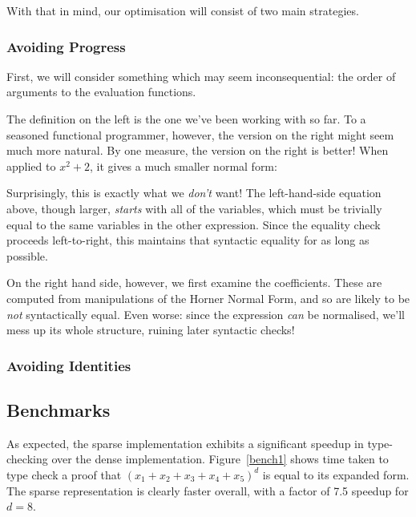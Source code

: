 \documentclass[acmsmall,review,anonymous]{acmart}\settopmatter{printfolios=true,printccs=false,printacmref=false}
\begin{document}
With that in mind, our optimisation will consist of two main strategies.
\subsubsection{Avoiding Progress}
First, we will consider something which may seem inconsequential: the order of
arguments to the evaluation functions.
\begin{multicols}{2}
  \centering
\end{multicols}
The definition on the left is the one we've been working with so far. To a
seasoned functional programmer, however, the version on the right might seem
much more natural. By one measure, the version on the right is better! When
applied to \(x^2 + 2\), it gives a much smaller normal form:
\begin{multicols}{2}
  \centering
\end{multicols}
Surprisingly, this is exactly what we \emph{don't} want! The left-hand-side
equation above, though larger, \emph{starts} with all of the variables, which
must be trivially equal to the same variables in the other expression. Since the
equality check proceeds left-to-right, this maintains that syntactic equality
for as long as possible.

On the right hand side, however, we first examine the coefficients. These are
computed from manipulations of the Horner Normal Form, and so are likely to be
\emph{not} syntactically equal. Even worse: since the expression \emph{can} be
normalised, we'll mess up its whole structure, ruining later syntactic checks!
\subsubsection{Avoiding Identities}

\subsection{Benchmarks}
As expected, the sparse implementation exhibits a significant speedup in
type-checking over the dense implementation. Figure~\ref{bench1}
shows time taken to type check a proof that \((x_1 + x_2 + x_3 + x_4 + x_5)^d\)
is equal to its expanded form. The sparse representation is clearly faster
overall, with a factor of 7.5 speedup for \(d = 8\).
\end{document}
